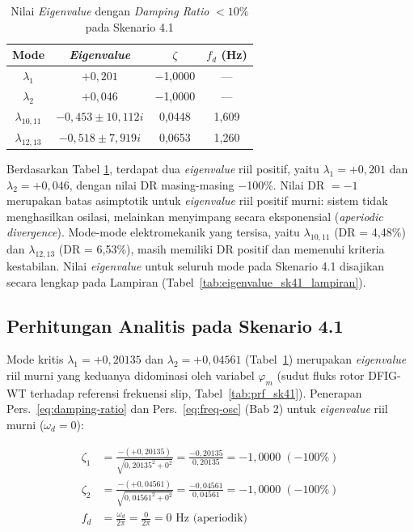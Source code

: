 \begin{table}[h]
	\caption{Nilai \textit{Eigenvalue} dengan \textit{Damping Ratio} $<10\%$
	pada Skenario 4.1}
	\vspace{0.5em}
	\centering
	\fontsize{12}{14.4}\selectfont
	\setlength{\tabcolsep}{6pt}
	\begin{tabular}{c c c c}
		\toprule
		\textbf{Mode} & \textbf{\textit{Eigenvalue}} & \textbf{$\zeta$} &
		\textbf{$f_d$ (Hz)} \\
		\midrule
		$\lambda_1$ & $+0{,}201$ & $-$1,0000 & --- \\
		$\lambda_2$ & $+0{,}046$ & $-$1,0000 & --- \\
		$\lambda_{10,11}$ & $-0{,}453 \pm 10{,}112i$ & 0,0448 & 1,609 \\
		$\lambda_{12,13}$ & $-0{,}518 \pm 7{,}919i$ & 0,0653 & 1,260 \\
		\bottomrule
	\end{tabular}
	\label{tab:eigenvalue_sk41}
\end{table}

Berdasarkan Tabel \ref{tab:eigenvalue_sk41}, terdapat dua \textit{eigenvalue}
riil positif, yaitu $\lambda_1 = +0{,}201$ dan $\lambda_2 = +0{,}046$, dengan nilai
DR masing-masing $-$100\%. Nilai DR $= -1$ merupakan batas asimptotik untuk
\textit{eigenvalue} riil positif murni: sistem tidak menghasilkan osilasi,
melainkan menyimpang secara eksponensial (\textit{aperiodic divergence}).
Mode-mode elektromekanik yang tersisa, yaitu $\lambda_{10,11}$ (DR = 4,48\%)
dan $\lambda_{12,13}$ (DR = 6,53\%), masih memiliki DR positif dan memenuhi
kriteria kestabilan. Nilai \textit{eigenvalue} untuk seluruh mode pada Skenario
4.1 disajikan secara lengkap pada Lampiran (Tabel~\ref{tab:eigenvalue_sk41_lampiran}).

\subsection{Perhitungan Analitis pada Skenario 4.1}

Mode kritis $\lambda_1 = +0{,}20135$ dan $\lambda_2 = +0{,}04561$
(Tabel~\ref{tab:eigenvalue_sk41}) merupakan \textit{eigenvalue} riil murni yang
keduanya didominasi oleh variabel $\varphi_m$ (sudut fluks rotor DFIG-WT
terhadap referensi frekuensi slip, Tabel~\ref{tab:prf_sk41}). Penerapan
Pers.~\ref{eq:damping-ratio} dan Pers.~\ref{eq:freq-osc} (Bab 2) untuk
\textit{eigenvalue} riil murni ($\omega_d = 0$):

\begin{align}
    \zeta_1 &= \frac{-(+0{,}20135)}{\sqrt{0{,}20135^2 + 0^2}}
             = \frac{-0{,}20135}{0{,}20135} = -1{,}0000 \;(-100\%) \\
    \zeta_2 &= \frac{-(+0{,}04561)}{\sqrt{0{,}04561^2 + 0^2}}
             = \frac{-0{,}04561}{0{,}04561} = -1{,}0000 \;(-100\%) \\
    f_{d}   &= \frac{\omega_d}{2\pi} = \frac{0}{2\pi} = 0 \text{ Hz (aperiodik)}
\end{align}


